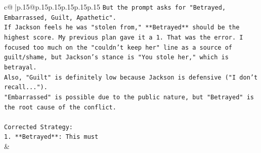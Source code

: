\documentclass{article}
\begin{document}
{\begin{supertabular}{c@{$\;$}|p{.15\linewidth}@{}p{.15\linewidth}p{.15\linewidth}p{.15\linewidth}p{.15\linewidth}p{.15\linewidth}}
{{{\texttt{But the prompt asks for "Betrayed, Embarrassed, Guilt, Apathetic".} \\
\texttt{If Jackson feels he was "stolen from," **Betrayed** should be the highest score. My previous plan gave it a 1. That was the error. I focused too much on the "couldn't keep her" line as a source of guilt/shame, but Jackson's stance is "You stole her," which is betrayal.} \\
\texttt{Also, "Guilt" is definitely low because Jackson is defensive ("I don't recall...").} \\
\texttt{"Embarrassed" is possible due to the public nature, but "Betrayed" is the root cause of the conflict.} \\
\\ 
\texttt{Corrected Strategy:} \\
\texttt{1.  **Betrayed**: This must} \\
            }
        }
    }
    & \\ \\

\end{supertabular}
}
\end{document}
